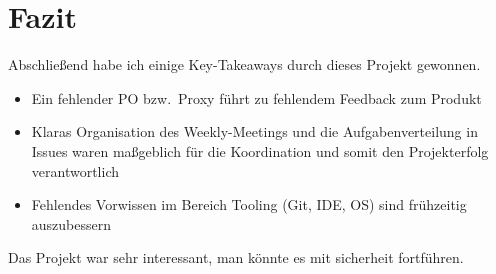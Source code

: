 

\section{Fazit}\label{sec:fazit}
Abschließend habe ich einige Key-Takeaways durch dieses Projekt gewonnen.
\begin{itemize}
    \item Ein fehlender PO bzw.\ Proxy führt zu fehlendem Feedback zum Produkt
    \item Klaras Organisation des Weekly-Meetings und die Aufgabenverteilung in Issues waren
    maßgeblich für die Koordination und
    somit den Projekterfolg verantwortlich
    \item Fehlendes Vorwissen im Bereich Tooling (Git, IDE, OS) sind frühzeitig auszubessern
\end{itemize}
Das Projekt war sehr interessant, man könnte es mit sicherheit fortführen.